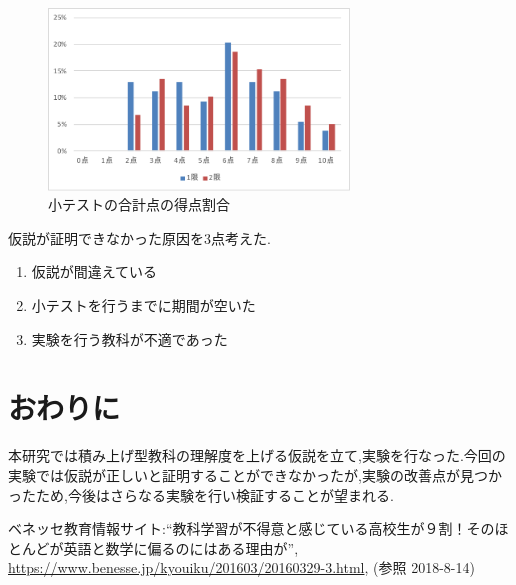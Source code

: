 \documentclass[twocolumn,10pt,a4j]{jsarticle}
\begin{document}
\begin{figure}[H]
\centering
\includegraphics[width=8cm]{total.pdf}
\caption{小テストの合計点の得点割合}
\label{fig:total}
\end{figure}

仮説が証明できなかった原因を3点考えた.
\begin{enumerate}
\renewcommand {\labelenumi}{(\arabic{enumi})}
\item 仮説が間違えている
\item 小テストを行うまでに期間が空いた
\item 実験を行う教科が不適であった
\end{enumerate}



\section{おわりに}
本研究では積み上げ型教科の理解度を上げる仮説を立て,実験を行なった.今回の実験では仮説が正しいと証明することができなかったが,実験の改善点が見つかったため,今後はさらなる実験を行い検証することが望まれる.

\begin{thebibliography}{99}
ベネッセ教育情報サイト:“教科学習が不得意と感じている高校生が９割！そのほとんどが英語と数学に偏るのにはある理由が”, \url{https://www.benesse.jp/kyouiku/201603/20160329-3.html}, (参照 2018-8-14)
\end{thebibliography}
\end{document}
